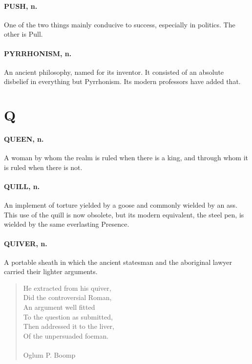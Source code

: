 \documentclass[11pt]{article}
\begin{document}
\paragraph{PUSH, n.}  One of the two things mainly conducive to success,
especially in politics.  The other is Pull.

\paragraph{PYRRHONISM, n.}  An ancient philosophy, named for its inventor.  It
consisted of an absolute disbelief in everything but Pyrrhonism.  Its
modern professors have added that.



\section*{Q}



\paragraph{QUEEN, n.}  A woman by whom the realm is ruled when there is a king,
and through whom it is ruled when there is not.

\paragraph{QUILL, n.}  An implement of torture yielded by a goose and commonly
wielded by an ass.  This use of the quill is now obsolete, but its
modern equivalent, the steel pen, is wielded by the same everlasting
Presence.

\paragraph{QUIVER, n.}  A portable sheath in which the ancient statesman and the
aboriginal lawyer carried their lighter arguments.

\begin{quote}   He extracted from his quiver, \\
      Did the controversial Roman, \\
  An argument well fitted \\
  To the question as submitted, \\
  Then addressed it to the liver, \\
      Of the unpersuaded foeman. \\
 \\
Oglum P. Boomp \end{quote}
\end{document}
